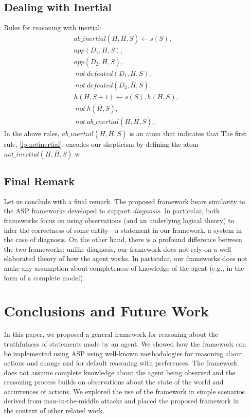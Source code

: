 \documentclass{article}
\def\naf{\: {not} \:}
\begin{document}
\subsection{Dealing with Inertial} 
 Rules for reasoning with inertial:
%
\begin{align}
ab\_inertial(H, \overline{H}, S) \leftarrow s(S), \label{lp:notinertial} \\
        app(D_1, H, S), \nonumber \\
        app(D_2, \overline{H}, S), \nonumber \\
        \naf defeated(D_1, H, S),  \nonumber \\
        \naf defeated(D_2, \overline{H}, S). \nonumber \\
h(H, S+1) \leftarrow s(S), h(H, S), \label{lp:inertial} \\ 
        \naf h(\overline{H}, S), \nonumber \\
        \naf ab\_inertial(H, \overline{H}, S). \nonumber        
\end{align} 
In the above rules, $ab\_inertial(H, \overline{H}, S)$ is an atom that indicates that 
The first rule, \eqref{lp:notinertial}, encodes our skepticism by defining the atom $not\_inertial(H, \overline{H}, S)$ w



\subsection{Final Remark}
Let us conclude with a final remark. 
 The proposed framework bears  similarity  to the ASP frameworks developed to
 support \emph{diagnosis}. In particular, both frameworks  focus on using observations (and an underlying logical theory) to infer the correctness of some entity---a statement in our framework, a system in the case of diagnosis. 
 On the other hand, there is a profound difference between the two frameworks: unlike diagnosis, our 
 framework does  not rely on  a well elaborated theory of how the agent works. In particular, our frameworks 
 does not make any assumption about completeness of knowledge of the agent (e.g., in the form of a complete
 model).
  \fi 
   
 \section{Conclusions and Future Work}
In this paper, we proposed a general framework for reasoning about the truthfulness of statements
made by an agent. We showed how the framework can be implemented using ASP using well-known methodologies for reasoning about actions and change and for default reasoning with preferences. The framework does not assume complete knowledge about the agent being observed and the reasoning 
process builds on observations about the state of the world and occurrences of actions. We explored the use of the
framework in simple scenarios derived from man-in-the-middle attacks and  placed the proposed framework in the context of other related work.
\end{document}
